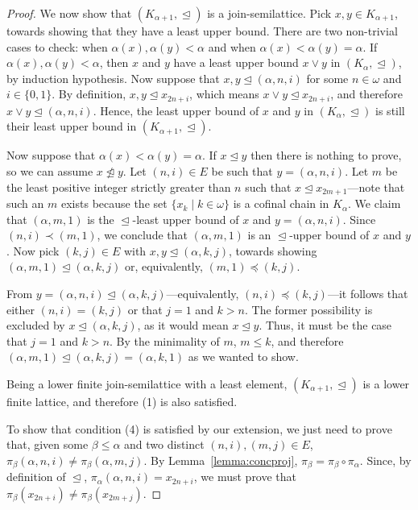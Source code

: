 \documentclass[]{amsart}
\theoremstyle{definition}
\theoremstyle{remark}
\begin{document}
\begin{proof}
We now show that $(K_{\alpha+1}, \trianglelefteq)$ is a join-semilattice. Pick $x,y \in K_{\alpha+1}$, towards showing that they have a least upper bound. There are two non-trivial cases to check: when $\alpha(x), \alpha(y) < \alpha$ and when $\alpha(x) < \alpha(y) = \alpha$. If $\alpha(x),\alpha(y) < \alpha$, then $x$ and $y$ have a least upper bound $x \vee y$ in $(K_\alpha, \trianglelefteq)$, by induction hypothesis. Now suppose that $x,y \trianglelefteq (\alpha, n, i)$ for some $n\in\omega$ and $i \in \{0,1\}$. By definition, $x, y \trianglelefteq x_{2n+i}$, which means $x \vee y \trianglelefteq x_{2n+i}$, and therefore $x \vee y \trianglelefteq (\alpha, n, i)$. Hence, the least upper bound of $x$ and $y$ in $(K_\alpha, \trianglelefteq)$ is still their least upper bound in $(K_{\alpha+1}, \trianglelefteq)$. 

Now suppose that $\alpha(x) < \alpha(y) = \alpha$. If $x \trianglelefteq y$ then there is nothing to prove, so we can assume $x \ntrianglelefteq y$. Let $(n,i) \in E$ be such that $y = (\alpha, n, i)$. Let $m$ be the least positive integer strictly greater than $n$ such that $x \trianglelefteq x_{2m+1}$---note that such an $m$ exists because the set $\{x_k \mid k \in \omega\}$ is a cofinal chain in $K_\alpha$.  We claim that $(\alpha, m, 1)$ is the $\trianglelefteq$-least upper bound of $x$ and $y = (\alpha, n, i)$. Since $(n, i) \prec (m, 1)$, we conclude that $(\alpha, m, 1)$ is an $\trianglelefteq$-upper bound of $x$ and $y$. Now pick $(k, j) \in E$ with $x,y \trianglelefteq (\alpha, k, j)$, towards showing $(\alpha, m, 1) \trianglelefteq (\alpha, k, j)$ or, equivalently, $(m, 1) \preceq (k, j)$. 

From $y = (\alpha, n, i) \trianglelefteq (\alpha, k ,j)$---equivalently, $(n, i) \preceq (k, j)$---it follows that either $(n, i) = (k, j)$ or that $j = 1$ and $k > n$. The former possibility is excluded by $x \trianglelefteq (\alpha, k, j)$, as it would mean $x \trianglelefteq y$. Thus, it must be the case that $j = 1$ and $k > n$. By the minimality of $m$, $m \le k$, and therefore $(\alpha, m, 1) \trianglelefteq (\alpha, k, j) = (\alpha, k, 1)$ as we wanted to show.

Being a lower finite join-semilattice with a least element, $(K_{\alpha+1}, \trianglelefteq)$ is a lower finite lattice, and therefore (1) is also satisfied. 

To show that condition (4) is satisfied by our extension, we just need to prove that, given some $\beta \le \alpha$ and two distinct $(n,i), (m,j) \in E$, $\pi_\beta(\alpha, n, i) \neq \pi_\beta(\alpha, m, j)$. By Lemma~\ref{lemma:concproj}, $\pi_\beta = \pi_\beta \circ \pi_\alpha$. Since, by definition of $\trianglelefteq$, $\pi_\alpha(\alpha, n, i) = x_{2n+i}$, we must prove that $\pi_\beta(x_{2n+i}) \neq \pi_\beta(x_{2m+j})$. 


\end{proof}
\end{document}
